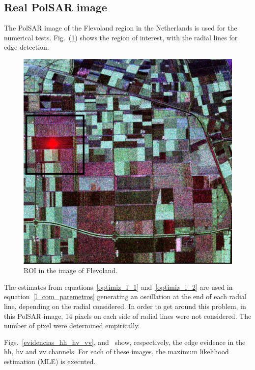 \documentclass[journal]{IEEEtran}
\begin{document}
\subsection{Real PolSAR image}
The PolSAR image of the Flevoland region in the Netherlands is used for the numerical tests. 
Fig.~(\ref{flevoland_radial_4look}) shows the region of interest, with the radial lines for edge detection.

\begin{figure}[hbt]
\centering
	\includegraphics[width=\linewidth]{flevoland_radial_4_look_black}
	\caption{ROI in the image of Flevoland.}
\label{flevoland_radial_4look}
\end{figure}

The estimates from equations~\eqref{optimiz_l_1} and~\eqref{optimiz_l_2} are used in equation~\eqref{l_com_paremetros} generating an oscillation at the end of each radial line, depending on the radial considered. In order to get around this problem, in this PolSAR image, 14 pixels on each side of radial lines were not considered. The number of pixel were determined empirically.

Figs.~\ref{evidencias_hh_hv_vv},  and~ show, respectively, the edge evidence in the $\text{hh}$, $\text{hv}$ and $\text{vv}$ channels. For each of these images, the maximum likelihood estimation (MLE) is executed.
\end{document}

